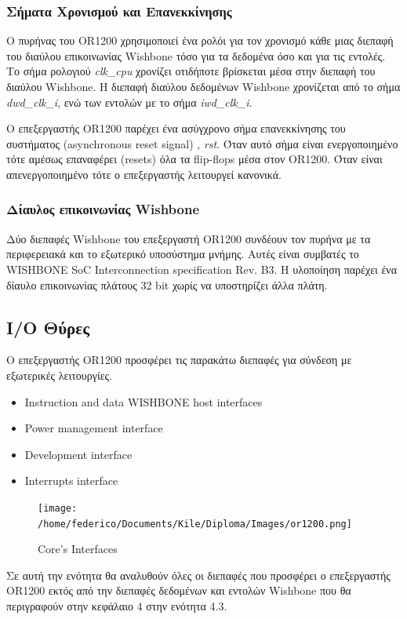\documentclass[a4paper,10pt]{article}
\numberwithin{figure}{section}
\numberwithin{table}{section}
\begin{document}
\subsubsection{Σήματα Χρονισμού και Επανεκκίνησης}

O πυρήνας του OR1200 χρησιμοποιεί ένα ρολόι για τον χρονισμό κάθε μιας διεπαφή του διαύλου
επικοινωνίας Wishbone τόσο για τα δεδομένα όσο και για τις εντολές. Το σήμα ρολογιού \emph{clk\_cpu}
χρονίζει οτιδήποτε βρίσκεται μέσα στην διεπαφή του διαύλου Wishbone. Η διεπαφή διαύλου δεδομένων
Wishbone χρονίζεται από το σήμα \emph{dwd\_clk\_i}, ενώ των εντολών με το σήμα \emph{iwd\_clk\_i}.
\newline

O επεξεργαστής OR1200 παρέχει ένα ασύγχρονο σήμα επανεκκίνησης του συστήματος (asynchronous reset signal)
, \emph{rst}. Όταν αυτό σήμα είναι ενεργοποιημένο τότε αμέσως επαναφέρει (resets) όλα τα 
flip-flops μέσα στον OR1200. Όταν είναι απενεργοποιημένο τότε ο επεξεργαστής λειτουργεί κανονικά.

\subsubsection{Δίαυλος επικοινωνίας Wishbone}

Δύο διεπαφές Wishbone του επεξεργαστή OR1200 συνδέουν τον πυρήνα με τα περιφερειακά και το
εξωτερικό υποσύστημα μνήμης. Αυτές είναι συμβατές το WISHBONE SoC Interconnection specification Rev. B3.
Η υλοποίηση παρέχει ένα δίαυλο επικοινωνίας πλάτους 32 bit χωρίς να υποστηρίζει άλλα πλάτη.

\newpage
\subsection{I/O Θύρες}

Ο επεξεργαστής OR1200 προσφέρει τις παρακάτω διεπαφές για σύνδεση με εξωτερικές λειτουργίες.
\begin{itemize}
 \item Instruction and data WISHBONE host interfaces
 \item Power management interface
 \item Development interface
 \item Interrupts interface
\end{itemize}
\vspace{0.7cm}
\begin{figure}[h!]
 \centering
 \texttt{[image: /home/federico/Documents/Kile/Diploma/Images/or1200.png]}
 \caption{Core's Interfaces}
\end{figure}
\vspace{0.7cm}
Σε αυτή την ενότητα θα αναλυθούν όλες οι διεπαφές που προσφέρει ο επεξεργαστής OR1200 εκτός από την διεπαφές δεδομένων και εντολών Wishbone που θα περιγραφούν στην κεφάλαιο 4 στην ενότητα 4.3.
\end{document}
